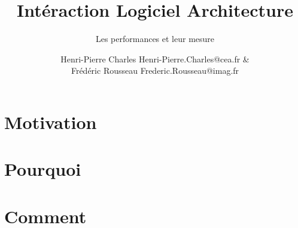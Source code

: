 \documentclass{beamer}
\title{Intéraction Logiciel Architecture}
\subtitle{Les performances et leur mesure}
\author{Henri-Pierre Charles Henri-Pierre.Charles@cea.fr \& \\
Frédéric Rousseau Frederic.Rousseau@imag.fr}
\date{}
\newcommand{\Slide}[1]{}
\begin{document}
\begin{frame}
\titlepage
\end{frame}

\section{Motivation}
\Slide{Metrics/Moore}
\Slide{Metrics/Top500}

\begin{frame}
  \begin{multicols}{2}
    \tableofcontents[]
  \end{multicols}
\end{frame}
\section{Pourquoi}
\Slide{Metrics/HowToMeasure}
\Slide{Metrics/FLOPS}
\Slide{Metrics/Sustained}
\Slide{Metrics/Lois}
\Slide{Metrics/Speedup}
\Slide{Metrics/Amdahl2}
\Slide{Metrics/Amdahl}
\Slide{Metrics/Roofline}
\Slide{Metrics/Roofline2}

\section{Comment}
\Slide{Comment/Outillage}
\Slide{Comment/C2}
\Slide{Comment/gprof}
\Slide{Comment/PerfCounter}
\Slide{Comment/JTAG}
\Slide{Comment/gdb}
\Slide{Comment/qemu}
\end{document}
